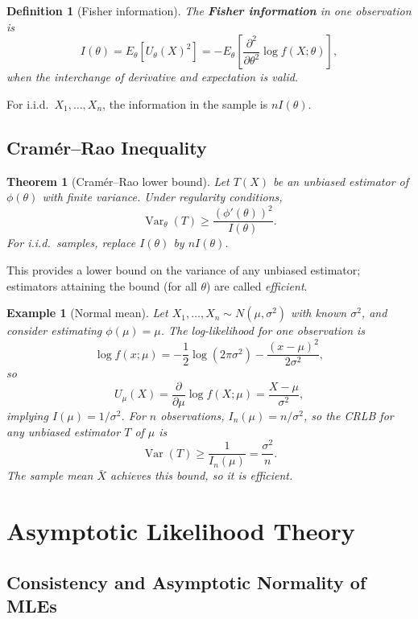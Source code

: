 \documentclass[11pt,a4paper]{article}
\newtheorem{definition}{Definition}[section]
\newtheorem{theorem}{Theorem}[section]
\newtheorem{example}{Example}[section]
\numberwithin{equation}{section}
\begin{document}
\begin{definition}[Fisher information]
The \textbf{Fisher information} in one observation is
\[
I(\theta) = E_\theta[U_\theta(X)^2]
= -E_\theta\left[\frac{\partial^2}{\partial\theta^2}\log f(X;\theta)\right],
\]
when the interchange of derivative and expectation is valid.
\end{definition}

For i.i.d.\ $X_1,\dots,X_n$, the information in the sample is $n I(\theta)$.

\subsection{Cram\'er--Rao Inequality}

\begin{theorem}[Cram\'er--Rao lower bound]
Let $T(X)$ be an unbiased estimator of $\phi(\theta)$ with finite variance. 
Under regularity conditions,
\[
\operatorname{Var}_\theta(T)
\ge \frac{(\phi'(\theta))^2}{I(\theta)}.
\]
For i.i.d.\ samples, replace $I(\theta)$ by $nI(\theta)$.
\end{theorem}

This provides a lower bound on the variance of any unbiased estimator; estimators attaining the bound (for all $\theta$) are called \emph{efficient}.

\begin{example}[Normal mean]
Let $X_1,\dots,X_n \sim N(\mu,\sigma^2)$ with known $\sigma^2$, and consider estimating $\phi(\mu)=\mu$. 
The log-likelihood for one observation is
\[
\log f(x;\mu) = -\frac{1}{2}\log(2\pi\sigma^2) - \frac{(x-\mu)^2}{2\sigma^2},
\]
so
\[
U_\mu(X) = \frac{\partial}{\partial\mu}\log f(X;\mu)
= \frac{X-\mu}{\sigma^2},
\]
implying $I(\mu) = 1/\sigma^2$. 
For $n$ observations, $I_n(\mu) = n/\sigma^2$, so the CRLB for any unbiased estimator $T$ of $\mu$ is
\[
\operatorname{Var}(T) \ge \frac{1}{I_n(\mu)} = \frac{\sigma^2}{n}.
\]
The sample mean $\bar{X}$ achieves this bound, so it is efficient.

\end{example}

\newpage

\section{Asymptotic Likelihood Theory}
\label{sec:likelihood-asymptotics}

\subsection{Consistency and Asymptotic Normality of MLEs}
\end{document}
